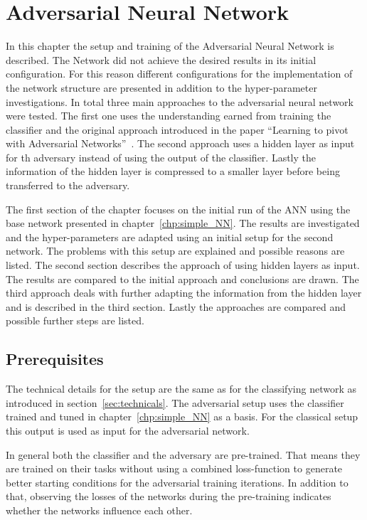 \chapter{Adversarial Neural Network}
\label{chp:ANN}

In this chapter the setup and training of the Adversarial Neural Network is described. The Network did not achieve the desired results in its initial configuration.
For this reason different configurations for the implementation of the network structure are presented in addition to the hyper-parameter investigations.
In total three main approaches to the adversarial neural network were tested. The first one uses the understanding earned from training the classifier and the original approach introduced in the paper \enquote{Learning to pivot with Adversarial Networks}~\cite{Louppe:2016ylz}. The second approach uses a hidden layer as input for th adversary instead of using the output of the classifier. Lastly the information of the hidden layer is compressed to a smaller layer before being transferred to the adversary.

The first section of the chapter focuses on the initial run of the ANN using the base network presented in chapter~\ref{chp:simple_NN}. The results are investigated and the hyper-parameters are adapted using an initial setup for the second network. The problems with this setup are explained and possible reasons are listed.
The second section describes the approach of using hidden layers as input. The results are compared to the initial approach and conclusions are drawn.
The third approach deals with further adapting the information from the hidden layer and is described in the third section.
Lastly the approaches are compared and possible further steps are listed.

\section*{Prerequisites}

The technical details for the setup are the same as for the classifying network as introduced in section~\ref{sec:technicals}.
The adversarial setup uses the classifier trained and tuned in chapter~\ref{chp:simple_NN} as a basis. For the classical setup this output is used as input for the adversarial network.

In general both the classifier and the adversary are pre-trained. That means they are trained on their tasks without using a combined loss-function to generate better starting conditions for the adversarial training iterations.
In addition to that, observing the losses of the networks during the pre-training indicates whether the networks influence each other.

